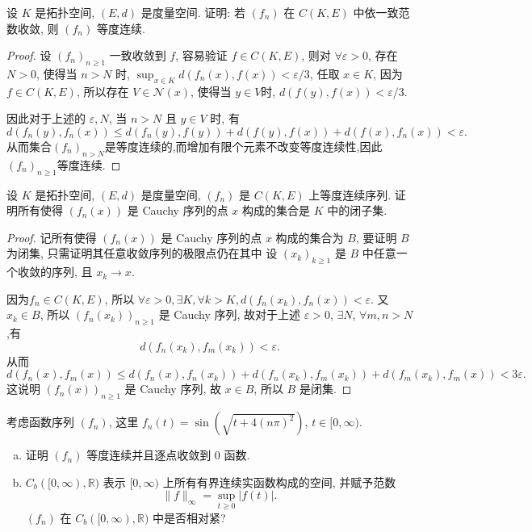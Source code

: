 




\begin{exercise}
    设 $K$ 是拓扑空间, $(E,d)$ 是度量空间. 证明: 
    若 $(f_{n})$ 在 $C(K, E)$ 中依一致范数收敛, 则 $(f_{n})$ 等度连续.
\end{exercise}

\begin{proof}
    设 $(f_n)_{n\geq 1}$ 一致收敛到 $f$, 容易验证 $f\in C(K,E)$,
    则对 $\forall\varepsilon>0$, 存在 $N>0$, 使得当 $n>N$ 时,
    $\sup_{x\in K}d(f_n(x),f(x))<\varepsilon/3$,
    任取 $x\in K$, 因为 $f\in C(K,E)$, 所以存在 $V\in\mathcal{N}(x)$,
    使得当 $y\in V$时, $d(f(y),f(x))<\varepsilon/3$.

    因此对于上述的 $\varepsilon,N$, 当 $n>N$ 且 $y\in V$ 时, 有
    \[d(f_n(y),f_n(x))\leq d(f_n(y),f(y))+d(f(y),f(x))+d(f(x),f_n(x))<\varepsilon.\]
    从而集合$(f_n)_{n>N}$是等度连续的,而增加有限个元素不改变等度连续性,因此$(f_n)_{n\geq 1}$等度连续.
\end{proof}



\begin{exercise}
    设 $K$ 是拓扑空间, $(E, d)$ 是度量空间, $(f_{n})$ 是 $C(K, E)$ 上等度连续序列. 
    证明所有使得 $(f_{n}(x))$ 是 Cauchy 序列的点 $x$ 构成的集合是 $K$ 中的闭子集.
\end{exercise}

\begin{proof}
  记所有使得 $(f_n(x))$ 是 Cauchy 序列的点 $x$ 构成的集合为 $B$,
  要证明 $B$ 为闭集, 只需证明其任意收敛序列的极限点仍在其中
  设 $(x_k)_{k\geq 1}$ 是 $B$ 中任意一个收敛的序列, 且 $x_k\to x$.

  因为$f_n\in C(K,E)$, 所以 $\forall\varepsilon>0,\exists K,\forall k>K,d(f_n(x_k),f_n(x))<\varepsilon$.
  又 $x_k\in B$, 所以 $(f_n(x_k))_{n\geq 1}$ 是 Cauchy 序列,
  故对于上述 $\varepsilon>0$, $\exists N$, $\forall m,n>N$,有
  \[d(f_n(x_k),f_m(x_k))<\varepsilon.\]
  从而
  \[d(f_n(x),f_m(x))\leq d(f_n(x),f_n(x_k))+d(f_n(x_k),f_m(x_k))+d(f_m(x_k),f_m(x))<3\varepsilon.\]
  这说明 $(f_n(x))_{n\geq 1}$ 是 Cauchy 序列, 故 $x\in B$, 所以 $B$ 是闭集.
\end{proof}


\begin{exercise}
  考虑函数序列 $(f_{n})$, 这里 $f_{n}(t)=\sin\left(\sqrt{t+4(n\pi)^2}\right)$, $t\in[0,\infty)$.
  \begin{enumerate}[(a)]
    \item 证明 $(f_{n})$ 等度连续并且逐点收敛到 $0$ 函数.
    \item $C_{b}([0,\infty),\mathbb{R})$ 表示 $[0, \infty)$ 上所有有界连续实函数构成的空间, 并赋予范数
    \[\|f\|_{\infty}=\sup_{t\geq 0}|f(t)|.\]
    $(f_n)$ 在 $C_b([0,\infty),\mathbb{R})$ 中是否相对紧?
  \end{enumerate}
\end{exercise}

